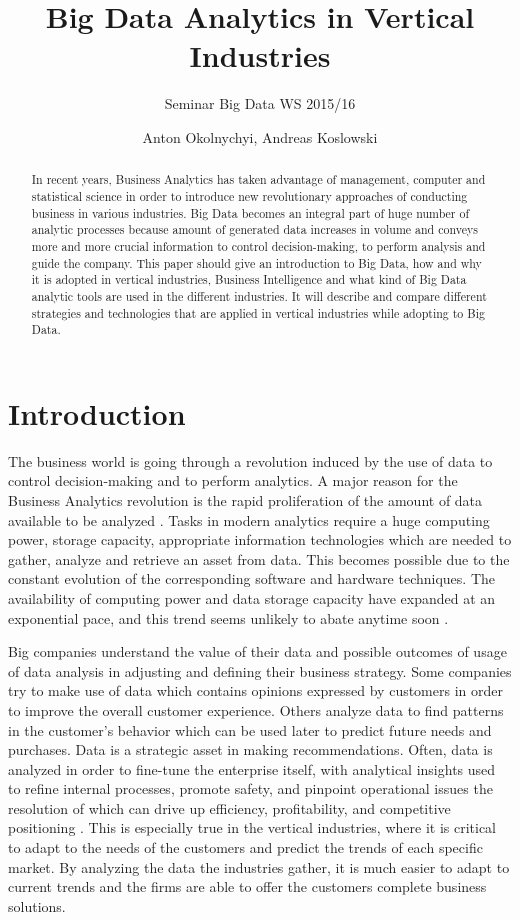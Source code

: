 \documentclass[runningheads]{llncs}
\title{Big Data Analytics in Vertical Industries}
\subtitle{Seminar Big Data WS 2015/16}
\author{Anton Okolnychyi, Andreas Koslowski}
\institute{RWTH Aachen University, 52056 Aachen, Germany\\
\{anton.okolnychyi, andreas.koslowski\}@rwth-aachen.de}
\begin{document}
\maketitle

\begin{abstract}
In recent years, Business Analytics has taken advantage of management, computer and statistical science in order to introduce new revolutionary approaches of conducting business in various industries. Big Data becomes an integral part of huge number of analytic processes because amount of generated data increases in volume and conveys more and more crucial information to control decision-making, to perform analysis and guide the company. 
This paper should give an introduction to Big Data, how and why it is adopted in vertical industries, Business Intelligence and what kind of Big Data analytic tools are used in the different industries. It will describe and compare different strategies and technologies that are applied in vertical industries while adopting to Big Data.
\end{abstract}

\section{Introduction}

The business world is going through a revolution induced by the use of data to control decision-making and to perform analytics. A major reason for the Business Analytics revolution is the rapid proliferation of the amount of data available to be analyzed \cite{Gopalkrishnan}. Tasks in modern analytics require a huge computing power, storage capacity, appropriate information technologies which are needed to gather, analyze and retrieve an asset from data. This becomes possible due to the constant evolution of the corresponding software and hardware techniques. The availability of computing power and data storage capacity have expanded at an exponential pace, and this trend seems unlikely to abate anytime soon \cite{NYTIMES}.  

Big companies understand the value of their data and possible outcomes of usage of data analysis in adjusting and defining their business strategy.  Some companies try to make use of data which contains opinions expressed by customers in order to improve the overall customer experience. Others analyze data to find patterns in the customer's behavior which can be used later to predict future needs and purchases. Data is a strategic asset in making recommendations. Often, data is analyzed in order to fine-tune the enterprise itself, with analytical insights used to refine internal processes, promote safety, and pinpoint operational issues the resolution of which can drive up efficiency, profitability, and competitive positioning \cite{Guszcza}.
This is especially true in the vertical industries, where it is critical to adapt to the needs of the customers and predict the trends of each specific market. By analyzing the data the industries gather, it is much easier to adapt to current trends and the firms are able to offer the customers complete business solutions.
\end{document}
